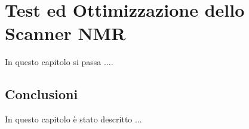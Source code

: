 \chapter{Test ed Ottimizzazione dello Scanner NMR}
\minitoc
\textsf{In questo capitolo si passa ....}\\



\section{Conclusioni}
In questo capitolo è stato descritto ...












